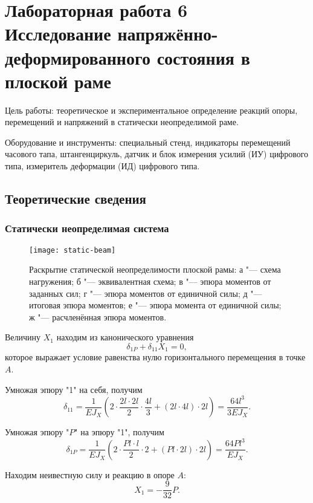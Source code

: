 \chapter{Лабораторная работа 6 \\
\Large Исследование напряжённо-деформированного состояния в плоской раме}

Цель работы: теоретическое и экспериментальное определение реакций опоры, перемещений и напряжений в статически неопределимой раме.

Оборудование и инструменты: специальный стенд, индикаторы перемещений часового тапа, штангенциркуль, датчик и блок измерения усилий (ИУ) цифрового типа, измеритель деформации (ИД) цифрового типа.

\section{Теоретические сведения}

\subsection{Статически неопределимая система}

\begin{figure}[!ht]
    \centering
    \texttt{[image: static-beam]}
    \caption{Раскрытие статической неопределимости плоской рамы:
        а "--- схема нагружения;
        б "--- эквивалентная схема;
        в "--- эпюра моментов от заданных сил;
        г "--- эпюра моментов от единичной силы;
        д "--- итоговая эпюра моментов;
        е "--- эпюра момента от единичной силы;
        ж "--- расчленённая эпюра моментов.
    }
    \label{fig:static-beam}
\end{figure}

Величину $X_1$ находим из канонического уравнения
\[
    \delta_{1P} + \delta_{11} X_1 = 0,
\]
которое выражает условие равенства нулю горизонтального перемещения в точке $A$.

Умножая эпюру "1" на себя, получим
\[
    \delta_{11}
    = \frac{1}{E J_X} \left(2 \cdot \frac{2 l \cdot 2 l}{2} \cdot \frac{4 l}{3} + (2 l \cdot 4 l) \cdot 2 l\right)
    = \frac{64 l^3}{3 E J_X}.
\]

Умножая эпюру "$P$" на эпюру "1", получим
\[
    \delta_{1P}
    = \frac{1}{E J_X} \left(2 \cdot \frac{P l \cdot l}{2} \cdot 2 + (P l \cdot 2 l) \cdot 2 l\right)
    = \frac{64 P l^3}{E J_X}.
\]

Находим неивестную силу и реакцию в опоре $A$:
\[
    X_1 = -\frac{9}{32} P.
\]

